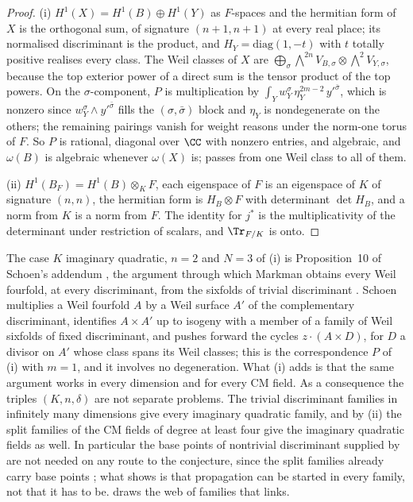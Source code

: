 \begin{proof}
(i) $H^{1}(X)=H^{1}(B)\oplus H^{1}(Y)$ as $F$-spaces and the hermitian form
of $X$ is the orthogonal sum, of signature $(n+1,n+1)$ at every real place;
its normalised discriminant is the product, and $H_{Y}=\mathrm{diag}(1,-t)$
with $t$ totally positive realises every class. The Weil classes of $X$ are
$\bigoplus_{\sigma}\bigwedge^{2n}V_{B,\sigma}\otimes\bigwedge^{2}V_{Y,\sigma}$,
because the top exterior power of a direct sum is the tensor product of the
top powers. On the $\sigma$-component, $P$ is multiplication by
$\int_{Y}w_{Y}^{\sigma}\,\eta_{Y}^{2m-2}\,y'^{\bar\sigma}$, which is nonzero
since $w_{Y}^{\sigma}\wedge y'^{\bar\sigma}$ fills the $(\sigma,\bar\sigma)$
block and $\eta_{Y}$ is nondegenerate on the others; the remaining pairings
vanish for weight reasons under the norm-one torus of $F$. So $P$ is
rational, diagonal over $\CC$ with nonzero entries, and algebraic, and
$\omega(B)$ is algebraic whenever $\omega(X)$ is; \cite[Lemma~16.3]{paperI}
passes from one Weil class to all of them.

(ii) $H^{1}(B_{F})=H^{1}(B)\otimes_{K}F$, each eigenspace of $F$ is an
eigenspace of $K$ of signature $(n,n)$, the hermitian form is $H_{B}\otimes F$ with determinant $\det H_{B}$, and a norm
from $K$ is a norm from $F$. The identity for $j^{*}$ is the multiplicativity
of the determinant under restriction of scalars, and $\Tr_{F/K}$ is onto.
\end{proof}

The case $K$ imaginary quadratic, $n=2$ and $N=3$ of (i) is Proposition~10
of Schoen's addendum \cite{Sch98}, the argument through which Markman obtains
every Weil fourfold, at every discriminant, from the sixfolds of trivial
discriminant \cite{Mar25a}. Schoen multiplies a Weil fourfold $A$ by a Weil
surface $A'$ of the complementary discriminant, identifies $A\times A'$ up to
isogeny with a member of a family of Weil sixfolds of fixed discriminant, and
pushes forward the cycles $z\cdot(A\times D)$, for $D$ a divisor on $A'$
whose class spans its Weil classes; this is the correspondence $P$ of (i)
with $m=1$, and it involves no degeneration. What (i) adds is that the same
argument works in every dimension and for every CM field. As a consequence
the triples $(K,n,\delta)$ are not separate problems. The trivial
discriminant families in infinitely many dimensions give every imaginary
quadratic family, and by (ii) the split families of the CM fields of degree
at least four give the imaginary quadratic fields as well. In particular the
base points of nontrivial discriminant supplied by \cite[Theorem~15.27]{paperI} are
not needed on any route to the conjecture, since the split families already
carry base points \cite[(34)]{paperI}; what \cite[Theorem~15.27]{paperI} shows
is that propagation can be started in every family, not that it has to be.
 draws the web of families that  links.

